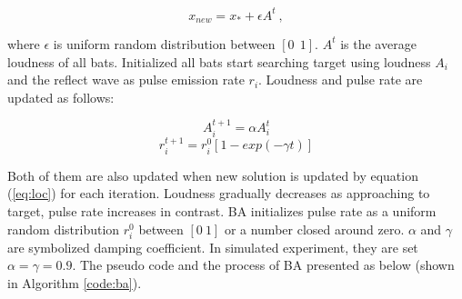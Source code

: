 \begin{equation}
x_{new}=x_{*}+ \epsilon A^t \ ,
\label{eq:loc}
\end{equation}

where ${\epsilon}$ is uniform random distribution between ${[0 \ \ 1]}$. ${A^t}$ is the average loudness of all bats. Initialized all bats start searching target using loudness ${A_i}$ and the reflect wave as pulse emission rate ${r_i}$. Loudness and pulse rate are updated as follows:

\begin{equation}
A_i^{t+1}=\alpha A_i^t
\label{eq:A}
\end{equation}
\begin{equation}
r_i^{t+1}=r_i^0[1-exp(-\gamma t)]
\label{eq:r}
\end{equation}

Both of them are also updated when new solution is updated by equation (\ref{eq:loc}) for each iteration.
 Loudness gradually decreases as approaching to target, pulse rate increases in contrast. BA initializes pulse rate as a uniform random distribution ${r_i^0}$ between ${[0 \ 1]}$ or a number closed around zero. ${\alpha}$ and ${\gamma}$ are symbolized damping coefficient. In simulated experiment, they are set ${\alpha = \gamma = 0.9}$. The pseudo code and the process of BA presented as below (shown in 
Algorithm \ref{code:ba}).

